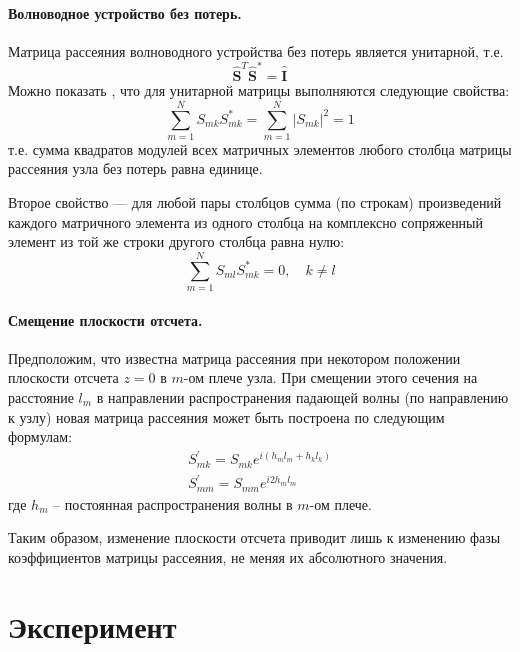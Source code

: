 \documentclass[a4paper,12pt]{article}
\newcommand\Smat{\hat { \mathbf { S } }}
\begin{document}
\paragraph{Волноводное устройство без потерь.} Матрица рассеяния волноводного устройства без потерь является унитарной, т.е.
\begin{equation}
	\Smat^T\Smat^*= \hat { \mathbf { I } }
\end{equation}
Можно показать \cite{met}, что для унитарной матрицы выполняются следующие свойства:
\begin{equation}
	\sum _ { m = 1 } ^ { N } S _ { m k } S _ { m k } ^ { * } = \sum _ { m = 1 } ^ { N } \left| S _ { m k } \right| ^ { 2 } = 1
\end{equation}
т.е. сумма квадратов модулей всех матричных элементов любого столбца матрицы рассеяния узла без потерь равна единице.

Второе свойство --- для любой пары столбцов сумма (по строкам) произведений каждого матричного элемента из одного столбца на комплексно сопряженный элемент из той же строки другого столбца равна нулю:
\begin{equation}
	\sum _ { m = 1 } ^ { N } S _ { m l } S _ { m k } ^ { * } = 0 , \quad k \neq l
\end{equation}

\paragraph{Смещение плоскости отсчета.} Предположим, что известна матрица рассеяния при некотором положении плоскости отсчета $z = 0$ в $m$-ом плече узла. При смещении этого сечения на расстояние $l_m$ в направлении распространения падающей волны (по направлению к узлу) новая матрица рассеяния может быть построена по следующим формулам:
\begin{equation}
	\begin{array} { l } { S _ { m k } ^ { \prime } = S _ { m k } e ^ { i \left( h _ { m } l _ { m } + h _ { k } l _ { k } \right) } } \\ { S _ { m m } ^ { \prime } = S _ { m m } e ^ { i 2 h _ { m } l _ { m } } } \end{array}
\end{equation}
где $h_m$ -- постоянная распространения волны в $m$-ом плече. 

Таким образом, изменение плоскости отсчета приводит лишь к изменению фазы коэффициентов матрицы рассеяния, не меняя их абсолютного значения. 


\newpage
\section{Эксперимент}
\end{document}
